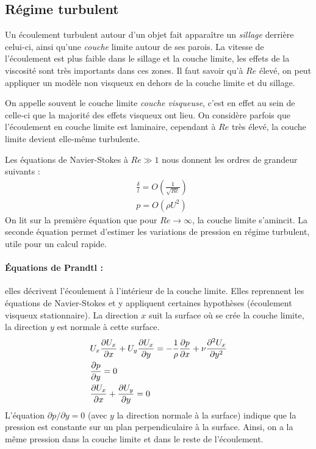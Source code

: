 \subsection{Régime turbulent}
Un écoulement turbulent autour d'un objet fait apparaître un \textit{sillage} derrière celui-ci, ainsi qu'une \textit{couche} limite autour de ses parois. La vitesse de l'écoulement est plus faible dans le sillage et la couche limite, les effets de la viscosité sont très importants dans ces zones. Il faut savoir qu'à $Re$ élevé, on peut appliquer un modèle non visqueux en dehors de la couche limite et du sillage.

On appelle souvent le couche limite \textit{couche visqueuse}, c'est en effet au sein de celle-ci que la majorité des effets visqueux ont lieu. On considère parfois que l'écoulement en couche limite est laminaire, cependant à $Re$ très élevé, la couche limite devient elle-même turbulente.

Les équations de Navier-Stokes à $Re \gg 1$ nous donnent les ordres de grandeur suivants :
%
\begin{align}
    & \frac {\delta}{l} = O \left( \frac{1}{\sqrt{Re}} \right) \\
    & p = O \left( \rho U^2 \right)
\end{align}
%
On lit sur la première équation que pour $Re \to \infty$, la couche limite s'amincit. La seconde équation permet d'estimer les variations de pression en régime turbulent, utile pour un calcul rapide.

\paragraph{Équations de Prandtl :}elles décrivent l'écoulement à l'intérieur de la couche limite. Elles reprennent les équations de Navier-Stokes et y appliquent certaines hypothèses (écoulement visqueux stationnaire). La direction $x$ suit la surface où se crée la couche limite, la direction $y$ est normale à cette surface.
%
\begin{align}[left=\empheqlbrace]
    & U_x \frac{ \partial U_x }{ \partial x }
    + U_y \frac{ \partial U_x }{ \partial y }
    = - \frac{1}{\rho} \frac{ \partial p }{ \partial x }
    + \nu \frac{ \partial^2 U_x }{ \partial y^2 } \\
    \notag & \frac{ \partial p }{ \partial y } = 0 \\
    \notag & \frac{ \partial U_x }{ \partial x }
           + \frac{ \partial U_y }{ \partial y } = 0
\end{align}
%
L'équation $\partial p / \partial y = 0$ (avec $y$ la direction normale à la surface) indique que la pression est constante sur un plan perpendiculaire à la surface. Ainsi, on a la même pression dans la couche limite et dans le reste de l'écoulement.


